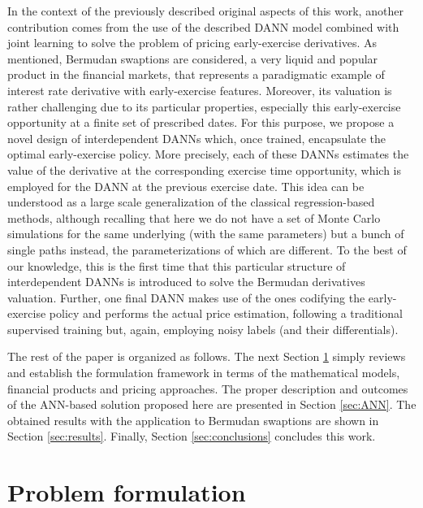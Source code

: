     In the context of the previously described original aspects of this work, another contribution comes from the use of the described DANN model combined with joint learning to solve the problem of pricing early-exercise derivatives. As mentioned, Bermudan swaptions are considered, a very liquid and popular product in the financial markets, that represents a paradigmatic example of interest rate derivative with early-exercise features. Moreover, its valuation is rather challenging due to its particular properties, especially this early-exercise opportunity at a finite set of prescribed dates. For this purpose, we propose a novel design of interdependent DANNs which, once trained, encapsulate the optimal early-exercise policy. More precisely, each of these DANNs estimates the value of the derivative at the corresponding exercise time opportunity, which is employed for the DANN at the previous exercise date. This idea can be understood as a large scale generalization of the classical regression-based methods, although recalling that here we do not have a set of Monte Carlo simulations for the same underlying (with the same parameters) but a bunch of single paths instead, the parameterizations of which are different. To the best of our knowledge, this is the first time that this particular structure of interdependent DANNs is introduced to solve the Bermudan derivatives valuation. Further, one final DANN makes use of the ones codifying the early-exercise policy and performs the actual price estimation, following a traditional supervised training but, again, employing noisy labels (and their differentials).

    The rest of the paper is organized as follows. The next Section \ref{sec:formulation} simply reviews and establish the formulation framework in terms of the mathematical models, financial products and pricing approaches. The proper description and outcomes of the ANN-based solution proposed here are presented in Section \ref{sec:ANN}. The obtained results with the application to Bermudan swaptions are shown in Section \ref{sec:results}. Finally, Section \ref{sec:conclusions} concludes this work.    

\section{Problem formulation}\label{sec:formulation}

